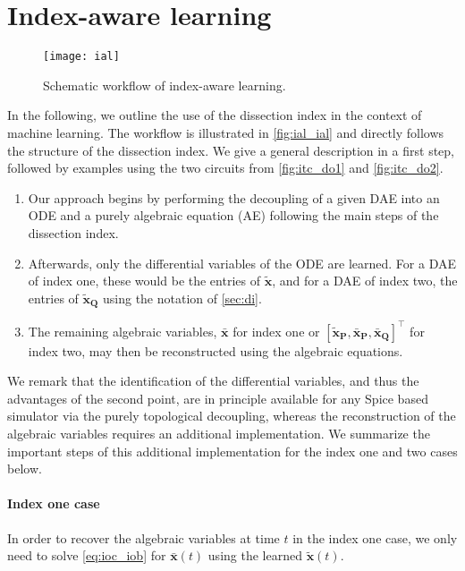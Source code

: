 \documentclass[AMA,STIX1COL]{WileyNJD-v2}
\newcommand{\mb}[1]{\mathbf{#1}}
\newcommand{\mbt}[1]{\tilde{\mathbf{#1}}}
\newcommand{\mbb}[1]{\bar{\mathbf{#1}}}
\newcommand{\T}{{\!\top}}
\begin{document}
\section{Index-aware learning}
\label{sec:ial}
\begin{figure}[b]
    \begin{center}
        \texttt{[image: ial]}
    \end{center}
    \caption{Schematic workflow of index-aware learning.}
    \label{fig:ial_ial}
\end{figure}
In the following, we outline the use of the dissection index in the context of machine learning. The workflow is illustrated in \autoref{fig:ial_ial} and directly follows the structure of the dissection index. We give a general description in a first step, followed by examples using the two circuits from \autoref{fig:itc_do1} and \autoref{fig:itc_do2}.
\begin{enumerate}
    \item Our approach begins by performing the decoupling of a given DAE into an ODE and a purely algebraic equation (AE) following the main steps of the dissection index.
    \item Afterwards, only the differential variables of the ODE are learned. For a DAE of index one, these would be the entries of $\mbt{x}$, and for a DAE of index two, the entries of $\mbt{x}_\mb{Q}$ using the notation of \autoref{sec:di}.
    \item The remaining algebraic variables, $\mbb{x}$ for index one or $[\mbt{x}_\mb{P}, \mbb{x}_\mb{P}, \mbb{x}_\mb{Q}]^\T$ for index two, may then be reconstructed using the algebraic equations.
\end{enumerate}
We remark that the identification of the differential variables, and thus the advantages of the second point, are in principle available for any Spice based simulator via the purely topological decoupling\cite{jansen2014}, whereas the reconstruction of the algebraic variables requires an additional implementation. We summarize the important steps of this additional implementation for the index one and two cases below.

\paragraph{Index one case}
In order to recover the algebraic variables at time $t$ in the index one case, we only need to solve \eqref{eq:ioc_iob} for $\mbb{x}(t)$ using the learned $\mbt{x}(t)$.
\end{document}
